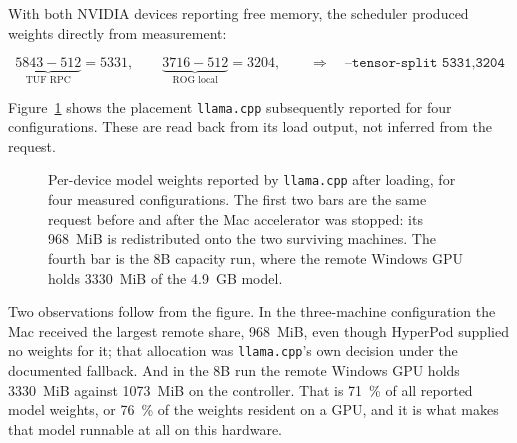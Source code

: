 With both NVIDIA devices reporting free memory, the scheduler produced weights
directly from measurement:

\[
\underbrace{5843 - 512}_{\text{TUF RPC}} = 5331,
\qquad
\underbrace{3716 - 512}_{\text{ROG local}} = 3204,
\qquad\Rightarrow\quad
\texttt{--tensor-split 5331,3204}
\]

Figure~\ref{fig:placement} shows the placement \texttt{llama.cpp} subsequently
reported for four configurations. These are read back from its load output, not
inferred from the request.

\begin{figure}[htbp]
\centering
{}
\caption{Per-device model weights reported by \texttt{llama.cpp} after loading,
for four measured configurations. The first two bars are the same request
before and after the Mac accelerator was stopped: its \SI{968}{MiB} is
redistributed onto the two surviving machines. The fourth bar is the 8B
capacity run, where the remote Windows GPU holds \SI{3330}{MiB} of the
\SI{4.9}{GB} model.}
\label{fig:placement}
\end{figure}

Two observations follow from the figure. In the three-machine configuration the
Mac received the largest remote share, \SI{968}{MiB}, even though HyperPod
supplied no weights for it; that allocation was \texttt{llama.cpp}'s own
decision under the documented fallback. And in the 8B run the remote Windows GPU
holds \SI{3330}{MiB} against \SI{1073}{MiB} on the controller. That is
\SI{71}{\percent} of all reported model weights, or \SI{76}{\percent} of the
weights resident on a GPU, and it is what makes that model runnable at all on
this hardware.

